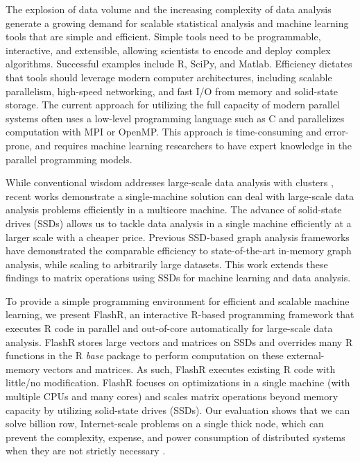 
The explosion of data volume and the increasing complexity of data analysis
generate a growing demand for scalable statistical analysis and machine
learning tools that are simple and efficient.
Simple tools need to be programmable, interactive, and extensible, 
allowing scientists to encode and deploy complex algorithms. 
Successful examples include R, SciPy, and Matlab.  Efficiency dictates that
tools should leverage modern computer architectures, including scalable
parallelism, high-speed networking, and fast I/O from memory and solid-state
storage. The current approach for utilizing the full
capacity of modern parallel systems often uses a low-level programming
language such as C and parallelizes computation with MPI or OpenMP.
This approach is time-consuming and error-prone, and requires machine learning
researchers to have expert knowledge in the parallel programming models.
 

While conventional wisdom addresses large-scale data analysis with clusters
\cite{mapreduce,spark,systemml,tensorflow,petuum,graphlab}, recent works
\cite{flashgraph,gridgraph,Matveev17,hotos} demonstrate a single-machine solution
can deal with large-scale data analysis problems efficiently in a multicore
machine. The advance of solid-state drives (SSDs) allows us to tackle data
analysis in a single machine efficiently at a larger scale with a cheaper price.
Previous SSD-based graph analysis frameworks \cite{flashgraph, gridgraph}
have demonstrated the comparable efficiency to state-of-the-art in-memory graph
analysis, while scaling to arbitrarily large datasets. This work extends
these findings to matrix operations using SSDs for machine learning and
data analysis.


To provide a simple programming environment for efficient and scalable machine
learning, we present FlashR, an interactive R-based programming framework that
executes R code in parallel and
out-of-core automatically for large-scale data analysis. FlashR stores large
vectors and matrices on SSDs and overrides many R functions in the R
\textit{base} package to perform computation on these external-memory vectors
and matrices.
As such, FlashR executes existing R code with little/no modification.
FlashR focuses on optimizations in a single machine (with multiple CPUs and
many cores) and scales matrix operations beyond memory capacity by 
utilizing solid-state drives (SSDs).  
Our evaluation shows that we can solve billion row, Internet-scale 
problems on a single thick node, which can prevent the complexity,
expense, and power consumption of distributed systems when they are
not strictly necessary \cite{hotos}.

